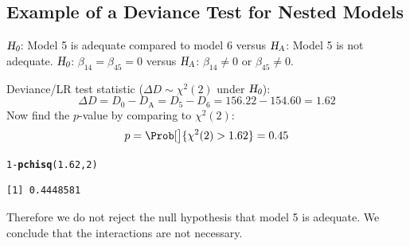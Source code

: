 \documentclass[oneside]{book}\usepackage[]{graphicx}\usepackage[svgnames]{xcolor}
\makeatletter
\newcommand{\hlnum}[1]{\textcolor[rgb]{0.686,0.059,0.569}{#1}}%
\newcommand{\hlopt}[1]{\textcolor[rgb]{0,0,0}{#1}}%
\newcommand{\hlstd}[1]{\textcolor[rgb]{0.345,0.345,0.345}{#1}}%
\newcommand{\hlkwd}[1]{\textcolor[rgb]{0.737,0.353,0.396}{\textbf{#1}}}%
\newenvironment{kframe}{%
 \def\at@end@of@kframe{}%
 \ifinner\ifhmode%
  \def\at@end@of@kframe{\end{minipage}}%
  \begin{minipage}{\columnwidth}%
 \fi\fi%
 \def\FrameCommand##1{\hskip\@totalleftmargin \hskip-\fboxsep
 \colorbox{shadecolor}{##1}\hskip-\fboxsep
     \hskip-\linewidth \hskip-\@totalleftmargin \hskip\columnwidth}%
 \MakeFramed {\advance\hsize-\width
   \@totalleftmargin\z@ \linewidth\hsize
   \@setminipage}}%
 {\par\unskip\endMakeFramed%
 \at@end@of@kframe}
\newenvironment{knitrout}{}{} %
\newcommand{\HN}{\textsl{H}_{\textsl{0}}}%
\newcommand{\HA}{\textsl{H}_{\textsl{A}}}%
\makeatother
\begin{document}
\subsection*{Example of a Deviance Test for Nested Models}
\begin{center}
      $ \HN $: Model 5 is adequate compared to model 6 versus $ \HA $: Model 5 is not adequate.
      $ \HN $: $ \beta_{14}=\beta_{45}=0 $ versus $ \HA $: $ \beta_{14}\ne 0 $ or $ \beta_{45}\ne 0 $.
\end{center}
Deviance/LR test statistic ($ \Delta D \sim \chi^2(2) $ under $ \HN $):
\[ \Delta D=D_0-D_\text{A}=D_5-D_6=156.22-154.60=1.62 \]
Now find the $ p $-value by comparing to $ \chi^2(2) $:
\[ p=\Prob[\big]{\chi^2(2)>1.62}=0.45 \]
\begin{knitrout}
\color{fgcolor}\begin{kframe}
\begin{alltt}
\hlnum{1} \hlopt{-} \hlkwd{pchisq}\hlstd{(}\hlnum{1.62}\hlstd{,} \hlnum{2}\hlstd{)}
\end{alltt}
\begin{verbatim}
[1] 0.4448581
\end{verbatim}
\end{kframe}
\end{knitrout}
Therefore we do not reject the null hypothesis that model 5 is adequate. We conclude
that the interactions are not necessary.
\end{document}
